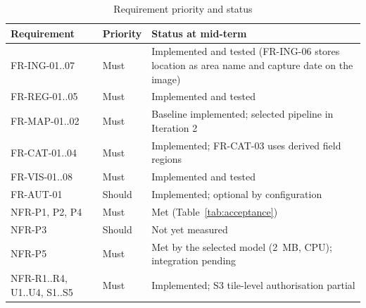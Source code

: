 \begin{table}[htbp]
\centering\small
\caption{Requirement priority and status}
\label{tab:reqstatus}
\begin{tabularx}{\textwidth}{L{2.6cm} L{1.6cm} Y}
\toprule
\textbf{Requirement} & \textbf{Priority} & \textbf{Status at mid-term}\\
\midrule
FR-ING-01..07 & Must & Implemented and tested (FR-ING-06 stores location as area name and capture date on the image)\\
FR-REG-01..05 & Must & Implemented and tested\\
FR-MAP-01..02 & Must & Baseline implemented; selected pipeline in Iteration 2\\
FR-CAT-01..04 & Must & Implemented; FR-CAT-03 uses derived field regions\\
FR-VIS-01..08 & Must & Implemented and tested\\
FR-AUT-01 & Should & Implemented; optional by configuration\\
NFR-P1, P2, P4 & Must & Met (Table~\ref{tab:acceptance})\\
NFR-P3 & Should & Not yet measured\\
NFR-P5 & Must & Met by the selected model (2~MB, CPU); integration pending\\
NFR-R1..R4, U1..U4, S1..S5 & Must & Implemented; S3 tile-level authorisation partial\\
\bottomrule
\end{tabularx}
\end{table}

